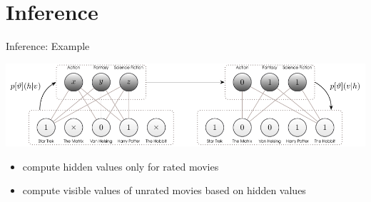 \documentclass[aspectratio=169]{beamer}
\begin{document}
  \section{Inference} %
  \label{sec:inference}
    \begin{frame}{Inference: Example}
      \begin{center}
        \includegraphics[width=\textwidth]{figures/rbm-inference-example.pdf}
      \end{center}
      \vfill
      \begin{itemize}
        \pause
        \item compute hidden values only for rated movies
        \pause
        \item compute visible values of unrated movies based on hidden values
      \end{itemize}
    \end{frame}


\end{document}
